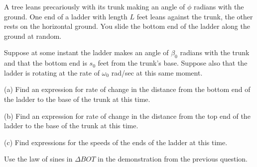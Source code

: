 \documentclass{ximera}
\begin{document}
\begin{question}  \label{Q:KNDMMD}
A tree leans precariously with its trunk making an angle of $\phi$ radians with the ground. One end of a ladder with length $L$ feet leans against the trunk, the other rests on the horizontal ground. You slide the bottom end of the ladder along the ground at random.

Suppose at some instant the ladder makes an angle of $\beta_0$ radians with the trunk and that the bottom end is $s_0$ feet from the trunk's base. Suppose also that the ladder is rotating at the rate of $\omega_0$ rad/sec at this same moment. 

(a) Find an expression for rate of change in the distance from the bottom end of the ladder to the base of the trunk at this time.  

(b) Find an expression for rate of change in the distance from the top end of the ladder to the base of the trunk at this time.

(c) Find expressions for the speeds of the ends of the ladder at this time.

\begin{hint}
Use the law of sines in $\Delta BOT$ in the demonstration from the previous question.
\end{hint} 


\end{question}
\end{document}
